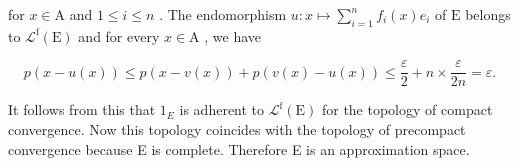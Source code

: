 for \(x \in \mathrm{A}\) and \(1 \leqslant i \leqslant n\) . The endomorphism \(u \colon x \mapsto \sum_{i=1}^{n} f_i(x)e_i\) of \(\mathrm{E}\) belongs to \(\mathcal{L}^{\mathrm{f}}(\mathrm{E})\) and for every \(x \in \mathrm{A}\) , we have

\[
p (x - u (x)) \leqslant p (x - v (x)) + p (v (x) - u (x)) \leqslant \frac {\varepsilon}{2} + n \times \frac {\varepsilon}{2 n} = \varepsilon .
\]

It follows from this that \(1_{E}\) is adherent to \(\mathcal{L}^{\mathrm{f}}(\mathrm{E})\) for the topology of compact convergence. Now this topology coincides with the topology of precompact convergence because E is complete. Therefore E is an approximation space.

